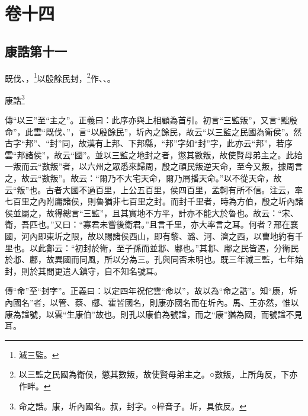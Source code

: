 

\chapter{卷十四}


\section{康誥第十一}


既伐、，\footnote{滅三監。}以殷餘民封，\footnote{以三監之民國為衛侯，懲其數叛，故使賢母弟主之。○數叛，上所角反，下亦作畔。}作、、。

康誥\footnote{命之誥。康，圻內國名。叔，封字。○梓音子。圻，具依反。}


{\noindent\zhuan{}\fzbyks 傳“以三”至“主之”。正義曰：此序亦與上相顧為首引。初言“三監叛”，又言“黜殷命”，此雲“既伐、”，言“以殷餘民”，圻內之餘民，故云“以三監之民國為衛侯”。然古字“邦”、“封”同，故漢有上邦、下邦縣，“邦”字如“封”字，此亦云“邦”，若序雲“邦諸侯”，故云“國”。並以三監之地封之者，懲其數叛，故使賢母弟主之。此始一叛而云“數叛”者，以六州之眾悉來歸周，殷之頑民叛逆天命，至今又叛，據周言之，故云“數叛”。故云：“爾乃不大宅天命，爾乃屑播天命。”以不從天命，故云“叛”也。古者大國不過百里，上公五百里，侯四百里，孟軻有所不信。注云，率七百里之內附庸諸侯，則魯猶非七百里之封。而封千里者，時為方伯，殷之圻內諸侯並屬之，故得總言“三監”，且其實地不方平，計亦不能大於魯也。故云：“宋、衛，吾匹也。”又曰：“寡君未嘗後衛君。”且言千里，亦大率言之耳。何者？邢在襄國，河內即東圻之限，故以賜諸侯西山，即有黎、潞、河、濟之西，以曹地約有千里也。以此鄭云：“初封於衛，至子孫而並邶、鄘也。”其邶、鄘之民皆遷，分衛民於邶、鄘，故異國而同風，所以分為三。孔與同否未明也。既三年滅三監，七年始封，則於其間更遣人鎮守，自不知名號耳。 \par}

{\noindent\zhuan{}\fzbyks 傳“命”至“封字”。正義曰：以定四年祝佗雲“命以”，故以為“命之誥”。知“康，圻內國名”者，以管、蔡、郕、霍皆國名，則康亦國名而在圻內。馬、王亦然，惟以康為諡號，以雲“生康伯”故也。則孔以康伯為號諡，而之“康”猶為國，而號諡不見耳。 \par}


